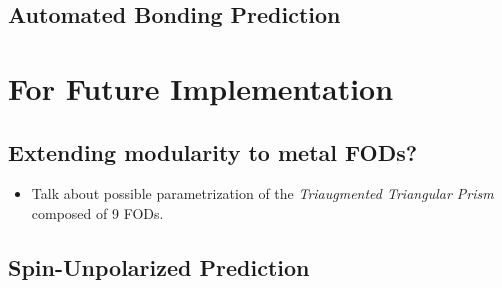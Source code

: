 \documentclass[12pt,a4paper,]{report}
\providecommand{\tightlist}{%
  \setlength{\itemsep}{0pt}\setlength{\parskip}{0pt}}
\begin{document}
\subsection{Automated Bonding
Prediction}\label{automated-bonding-prediction}

\section{For Future Implementation}\label{for-future-implementation}

\subsection{Extending modularity to metal
FODs?}\label{extending-modularity-to-metal-fods}

\begin{itemize}
\tightlist
\item
  Talk about possible parametrization of the \emph{Triaugmented
  Triangular Prism} composed of 9 FODs.
\end{itemize}

\subsection{Spin-Unpolarized
Prediction}\label{spin-unpolarized-prediction}
\end{document}

